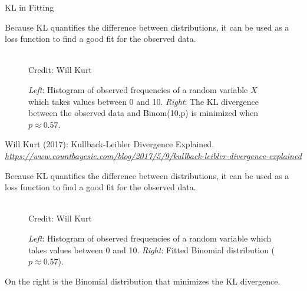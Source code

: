 \documentclass[11pt,compress,t,notes=noshow, xcolor=table]{beamer}
\begin{document}
\begin{vbframe} {KL in Fitting}

Because KL quantifies the difference between distributions, it can be used as a loss function to find a good fit for the observed data.

\begin{figure}
    \centering
      \tiny{\\ Credit: Will Kurt}
      \caption{ \footnotesize{\textit{Left}: Histogram of observed frequencies of a random variable $X$ which takes values between 0 and 10. \textit{Right}: The KL divergence between the observed data and Binom(10,p) is minimized when $p \approx 0.57$.}}
\end{figure}

{\tiny Will Kurt (2017): Kullback-Leibler Divergence Explained. 
\emph{\url{https://www.countbayesie.com/blog/2017/5/9/kullback-leibler-divergence-explained}}\par}

\framebreak

Because KL quantifies the difference between distributions, it can be used as a loss function to find a good fit for the observed data.

\begin{figure}
    \centering
      \tiny{\\ Credit: Will Kurt}
      \caption{\footnotesize{\textit{Left}: Histogram of observed frequencies of a random variable which takes values between 0 and 10. \textit{Right}: Fitted Binomial distribution ($p \approx 0.57$).}}
\end{figure}

On the right is the Binomial distribution that minimizes the KL divergence.
\end{vbframe}
\end{document}
